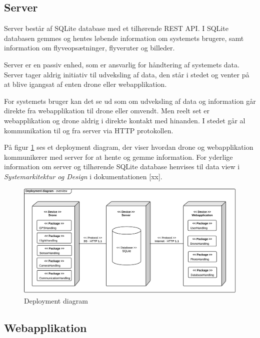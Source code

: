 \newpage 

\subsection{Server}

Server består af SQLite database med et tilhørende REST API. I SQLite databasen gemmes og hentes løbende information om systemets brugere, samt information om flyveopsætninger, flyveruter og billeder.  

Server er en passiv enhed, som er ansvarlig for håndtering af systemets data. Server tager aldrig initiativ til udveksling af data, den står i stedet og venter på at blive igangsat af enten drone eller webapplikation.

For systemets bruger kan det se ud som om udveksling af data og information går direkte fra webapplikation til drone eller omvendt. Men reelt set er webapplikation og drone aldrig i direkte kontakt med hinanden. I stedet går al kommunikation til og fra server via HTTP protokollen. 

På figur \ref{fig:deployment_diagram} ses et deployment diagram, der viser hvordan drone og webapplikation kommunikerer med server for at hente og gemme information. For yderlige information om server og tilhørende SQLite database henvises til data view i \textit{Systemarkitektur og Design} i dokumentationen [xx].

\begin{figure}[H]
\centering
\includegraphics[width=1\textwidth]{Billeder/deployment_overview.png}
\vspace{-0.5cm}
\caption{Deployment diagram}
\label{fig:deployment_diagram}
\end{figure}
 
\newpage


\subsection{Webapplikation}

